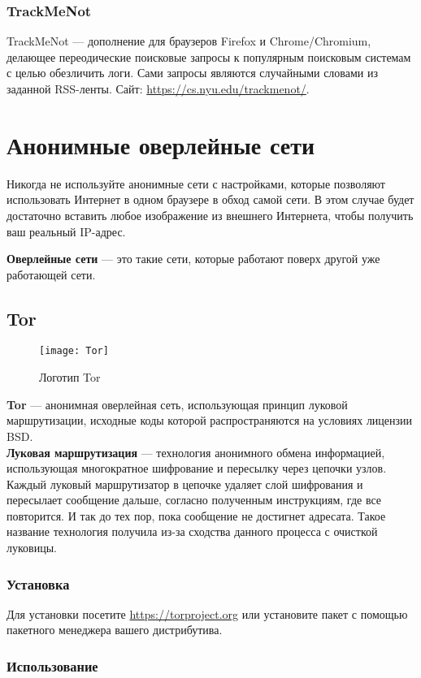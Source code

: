 \subsubsection{TrackMeNot}
TrackMeNot --- дополнение для браузеров Firefox и Chrome/Chromium, делающее переодические поисковые запросы к популярным поисковым системам с целью обезличить логи. Сами запросы являются случайными словами из заданной RSS-ленты. Сайт: \url{https://cs.nyu.edu/trackmenot/}.

\section{Анонимные оверлейные сети}
\begin{important}
Никогда не используйте анонимные сети с настройками, которые позволяют использовать Интернет в одном браузере в обход самой сети. В этом случае будет достаточно вставить любое изображение из внешнего Интернета, чтобы получить ваш реальный IP-адрес.
\end{important}
\textbf{Оверлейные сети} --- это такие сети, которые работают поверх другой уже работающей сети.
\subsection{Tor}
\begin{wrapfigure}[9]{r}{0.25\linewidth}
\texttt{[image: Tor]}
\caption{Логотип Tor}
\end{wrapfigure}
\textbf{Tor} --- анонимная оверлейная сеть, использующая принцип луковой маршрутизации, исходные коды которой распространяются на условиях лицензии BSD\cite{tor_license}.\\
\textbf{Луковая маршрутизация} --- технология анонимного обмена информацией, использующая многократное шифрование и пересылку через цепочки узлов. Каждый луковый маршрутизатор в цепочке удаляет слой шифрования и пересылает сообщение дальше, согласно полученным инструкциям, где все повторится. И так до тех пор, пока сообщение не достигнет адресата. Такое название технология получила из-за сходства данного процесса с очисткой луковицы.\\
\subsubsection{Установка}
Для установки посетите \url{https://torproject.org} или установите пакет с помощью пакетного менеджера вашего дистрибутива.
\subsubsection{Использование}
